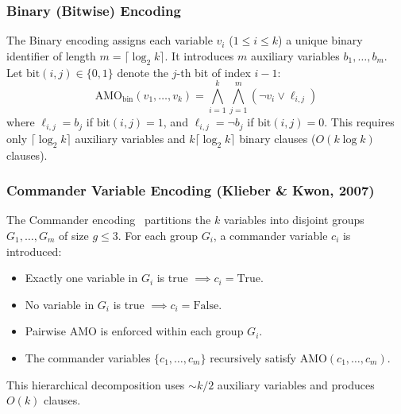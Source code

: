 \documentclass[a4paper,fleqn]{cas-sc}
\begin{document}
\subsubsection{Binary (Bitwise) Encoding}
The Binary encoding assigns each variable $v_i$ ($1 \le i \le k$) a unique binary identifier of length $m = \lceil \log_2 k \rceil$. It introduces $m$ auxiliary variables $b_1, \ldots, b_m$. Let $\text{bit}(i, j) \in \{0, 1\}$ denote the $j$-th bit of index $i-1$:
\begin{equation}
    \text{AMO}_{\text{bin}}(v_1, \ldots, v_k) = \bigwedge_{i=1}^{k} \bigwedge_{j=1}^{m} \left( \neg v_i \vee \ell_{i,j} \right)
    \label{eq:amo_bitwise}
\end{equation}
where $\ell_{i,j} = b_j$ if $\text{bit}(i, j) = 1$, and $\ell_{i,j} = \neg b_j$ if $\text{bit}(i, j) = 0$. This requires only $\lceil \log_2 k \rceil$ auxiliary variables and $k \lceil \log_2 k \rceil$ binary clauses ($O(k \log k)$ clauses).

\subsubsection{Commander Variable Encoding (Klieber \& Kwon, 2007)}
The Commander encoding~\cite{klieber2007commander} partitions the $k$ variables into disjoint groups $G_1, \ldots, G_m$ of size $g \le 3$. For each group $G_i$, a commander variable $c_i$ is introduced:
\begin{itemize}[noitemsep]
    \item Exactly one variable in $G_i$ is true $\implies c_i = \text{True}$.
    \item No variable in $G_i$ is true $\implies c_i = \text{False}$.
    \item Pairwise AMO is enforced within each group $G_i$.
    \item The commander variables $\{c_1, \ldots, c_m\}$ recursively satisfy $\text{AMO}(c_1, \ldots, c_m)$.
\end{itemize}
This hierarchical decomposition uses $\sim k/2$ auxiliary variables and produces $O(k)$ clauses.
\end{document}
